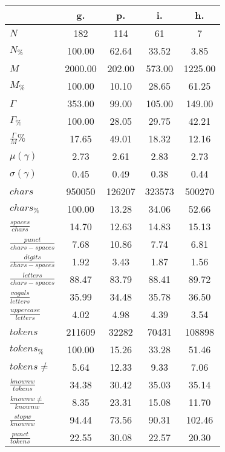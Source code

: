 \begin{table}[h!]
\begin{center}
\begin{tabular}{| l || c | c | c | c |}\hline
 & {\bf g.} & {\bf p.} & {\bf i.} & {\bf h.} \\\hline\hline
$N$ & 182  & 114  & 61  & 7 \\
$N_{\%}$ & 100.00  & 62.64  & 33.52  & 3.85 \\\hline
$M$ & 2000.00  & 202.00  & 573.00  & 1225.00 \\
$M_{\%}$ & 100.00  & 10.10  & 28.65  & 61.25 \\\hline
$\Gamma$ & 353.00  & 99.00  & 105.00  & 149.00 \\
$\Gamma_{\%}$ & 100.00  & 28.05  & 29.75  & 42.21 \\\hline
$\frac{\Gamma}{M}\%$ & 17.65  & 49.01  & 18.32  & 12.16 \\
$\mu(\gamma)$ & 2.73  & 2.61  & 2.83  & 2.73 \\
$\sigma(\gamma)$ & 0.45  & 0.49  & 0.38  & 0.44 \\\hline\hline
$chars$ & 950050  & 126207  & 323573  & 500270 \\
$chars_{\%}$ & 100.00  & 13.28  & 34.06  & 52.66 \\\hline
$\frac{spaces}{chars}$ & 14.70  & 12.63  & 14.83  & 15.13 \\
$\frac{punct}{chars-spaces}$ & 7.68  & 10.86  & 7.74  & 6.81 \\
$\frac{digits}{chars-spaces}$ & 1.92  & 3.43  & 1.87  & 1.56 \\\hline
$\frac{letters}{chars-spaces}$ & 88.47  & 83.79  & 88.41  & 89.72 \\
$\frac{vogals}{letters}$ & 35.99  & 34.48  & 35.78  & 36.50 \\
$\frac{uppercase}{letters}$ & 4.02  & 4.98  & 4.39  & 3.54 \\\hline\hline
$tokens$ & 211609  & 32282  & 70431  & 108898 \\
$tokens_{\%}$ & 100.00  & 15.26  & 33.28  & 51.46 \\
$tokens \neq$ & 5.64  & 12.33  & 9.33  & 7.06 \\\hline
$\frac{knownw}{tokens}$ & 34.38  & 30.42  & 35.03  & 35.14 \\
$\frac{knownw \neq}{knownw}$ & 8.35  & 23.31  & 15.08  & 11.70 \\\hline
$\frac{stopw}{knownw}$ & 94.44  & 73.56  & 90.31  & 102.46 \\
$\frac{punct}{tokens}$ & 22.55  & 30.08  & 22.57  & 20.30 \\

\end{tabular}
\end{center}
\end{table}

